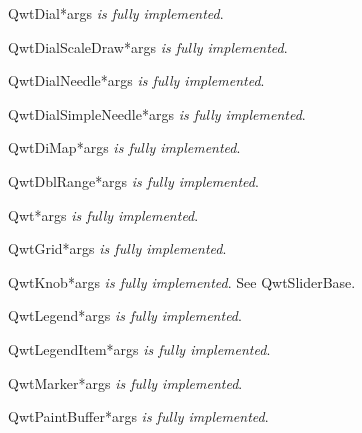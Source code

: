 \documentclass{manual}
\begin{document}
\begin{classdesc}{QwtDial}{*args}
\emph{is fully implemented}.
\end{classdesc}

\begin{classdesc}{QwtDialScaleDraw}{*args}
\emph{is fully implemented}.
\end{classdesc}

\begin{classdesc}{QwtDialNeedle}{*args}
\emph{is fully implemented}.
\end{classdesc}

\begin{classdesc}{QwtDialSimpleNeedle}{*args}
\emph{is fully implemented}.
\end{classdesc}

\begin{classdesc}{QwtDiMap}{*args}
\emph{is fully implemented}.
\end{classdesc}

\begin{classdesc}{QwtDblRange}{*args}
\emph{is fully implemented}.
\end{classdesc}

\begin{classdesc}{Qwt}{*args}
\emph{is fully implemented}.
\end{classdesc}

\begin{classdesc}{QwtGrid}{*args}
\emph{is fully implemented}.
\end{classdesc}

\begin{classdesc}{QwtKnob}{*args}
\emph{is fully implemented}. See QwtSliderBase.
\end{classdesc}

\begin{classdesc}{QwtLegend}{*args}
\emph{is fully implemented}.
\end{classdesc}

\begin{classdesc}{QwtLegendItem}{*args}
\emph{is fully implemented}.
\end{classdesc}

\begin{classdesc}{QwtMarker}{*args}
\emph{is fully implemented}.
\end{classdesc}

\begin{classdesc}{QwtPaintBuffer}{*args}
\emph{is fully implemented}.
\end{classdesc}
\end{document}
